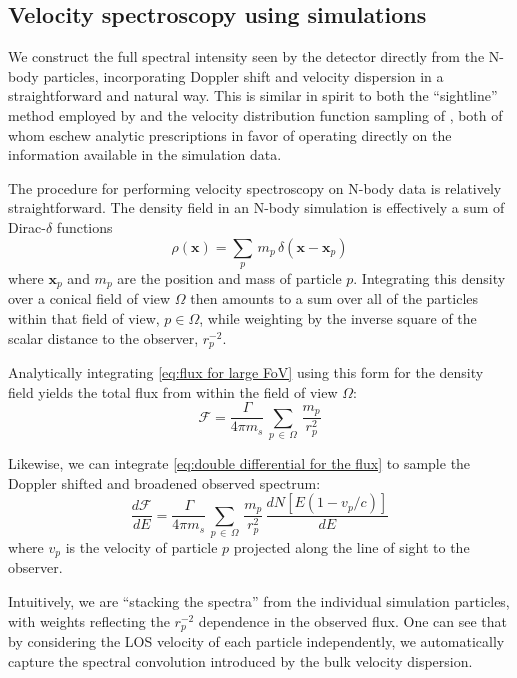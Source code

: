 \documentclass[aps,prl,10pt,twocolumn,superscriptaddress,showpacs]{revtex4-1}
\newcommand{\bvec}[1]{\mathbf{#1}}
\begin{document}

\subsection{Velocity spectroscopy using simulations}
\label{sec:simulations}

We construct the full
spectral intensity seen by the detector directly from the N-body particles, incorporating Doppler shift
and velocity dispersion in a straightforward and natural way.   This is similar in spirit to both the ``sightline'' method employed by 
\cite{lovell2015} and the velocity distribution function sampling of \cite{mao2013}, both of whom
eschew analytic prescriptions in favor of operating directly on the information available in the
simulation data. 

The procedure for performing velocity spectroscopy on N-body data is relatively straightforward.
The density field in an N-body simulation is effectively a sum of Dirac-$\delta$ functions
$$
\rho(\bvec{x}) = \sum_p\, m_p\, \delta(\bvec{x}-\bvec{x}_p)
$$
where $\bvec{x}_p$ and $m_p$ are the position and mass of particle $p$. Integrating this density over a conical
field of view $\Omega$ then amounts to a sum over all of the particles within that field of view, $p \in
\Omega$, while weighting by the inverse square of the scalar distance to the observer, $r^{-2}_p$. 

Analytically integrating \eqref{eq:flux for large FoV} using this form for the density field yields the
total flux from within the field of view $\Omega$:
\begin{equation} 
	\mathcal{F} = \frac{\Gamma}{4\pi m_s}
	\, \sum_{p \, \in \, \Omega} \, \frac{m_p}{r_p^{2}} 
\end{equation}

Likewise, we can integrate \eqref{eq:double differential for the flux} to sample the Doppler shifted
and broadened observed spectrum:
\begin{equation} \label{eq:discrete}
	\frac{d\mathcal{F}}{dE} = \frac{\Gamma}{4 \pi m_s}\, \sum_{p \, \in \, \Omega}
	\, \frac{m_p}{r_p^{2}} \, \frac{dN[E(1-v_p/c)]}{dE}
\end{equation}
where $v_p$ is the velocity of particle $p$ projected along the line of sight to the observer.

Intuitively, we are ``stacking the spectra'' from the individual simulation
particles, with weights reflecting the $r_p^{-2}$ dependence in the observed flux. One can see that by
considering the LOS velocity of each particle independently, we automatically capture the spectral
convolution introduced by the bulk velocity dispersion. 
\end{document}
